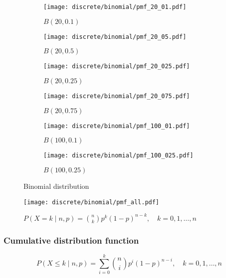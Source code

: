 \begin{figure}[H]
	\centering
	\begin{subfigure}[b]{0.45\textwidth}
		\texttt{[image: discrete/binomial/pmf\_20\_01.pdf]}
		\caption{$B(20, 0.1)$}
	\end{subfigure}
	\begin{subfigure}[b]{0.45\textwidth}
		\texttt{[image: discrete/binomial/pmf\_20\_05.pdf]}
		\caption{$B(20, 0.5)$}
	\end{subfigure}
	\begin{subfigure}[b]{0.45\textwidth}
		\texttt{[image: discrete/binomial/pmf\_20\_025.pdf]}
		\caption{$B(20, 0.25)$}
	\end{subfigure}
	\begin{subfigure}[b]{0.45\textwidth}
		\texttt{[image: discrete/binomial/pmf\_20\_075.pdf]}
		\caption{$B(20, 0.75)$}
	\end{subfigure}
	\begin{subfigure}[b]{0.45\textwidth}
		\texttt{[image: discrete/binomial/pmf\_100\_01.pdf]}
		\caption{$B(100, 0.1)$}
	\end{subfigure}
	\begin{subfigure}[b]{0.45\textwidth}
		\texttt{[image: discrete/binomial/pmf\_100\_025.pdf]}
		\caption{$B(100, 0.25)$}
	\end{subfigure}
	\caption{Binomial distribution}
\end{figure}

\begin{figure}[H]
	\texttt{[image: discrete/binomial/pmf\_all.pdf]}
	\caption{$P(X = k \mid n, p) = \binom{n}{k}p^{k}(1 - p)^{n - k}, \quad k = 0, 1, \ldots, n$}
\end{figure}

\subsubsection{Cumulative distribution function}
\[
	P(X \leq k \mid n, p) = \sum_{i = 0}^{k} \binom{n}{i}p^{i}(1 - p)^{n - i}, \quad k = 0, 1, \ldots, n
\]

